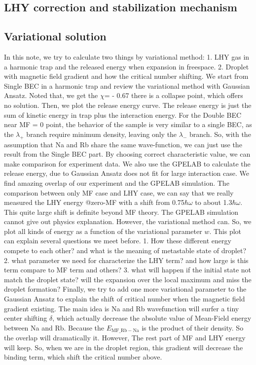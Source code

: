 \subsection{LHY correction and stabilization mechanism}
\subsection{Variational solution}
In this note, we try to calculate two things by variational method: 1. LHY gas in a harmonic trap and the released energy when expansion in freespace. 2. Droplet  with magnetic field gradient and how the critical number shifting. 
We start from Single BEC in a harmonic trap and review the variational method with Gaussian Ansatz. Noted that, we get the $\chi $= - 0.67 there is a collapse point, which offers no solution. Then, we plot the release energy curve. The release energy is just the sum of kinetic energy in trap plus the interaction energy. 
For the Double BEC near MF = 0 point, the behavior of the sample is very similar to a single BEC, as the $\lambda _+$ branch require minimum density, leaving only the $\lambda _-$ branch. So, with the assumption that Na and Rb share the same wave-function, we can just use the result from the Single BEC part. By choosing { }correct characteristic value, we can make comparison for experiment data.
We also use the GPELAB to calculate the release energy, due to Gaussian Ansatz does not fit for large interaction case. We find amazing overlap of our experiment and the GPELAB simulation. The comparison between only MF case and LHY case, we can say that we really measured the LHY energy @zero-MF with a shift from 0.75$\hbar \omega $ to about 1.3$\hbar \omega $. This quite large shift is definite beyond MF theory.
The GPELAB simulation cannot give out physics explanation. However, the variational method can. So, we plot all kinds of energy as a function of the variational parameter $w$. This plot can explain several questions we meet before. 1. How these different energy compete to each other? and what is the meaning of metastable state of droplet? 2. what parameter we need for characterize the LHY term? and how large is this term compare to MF term and others? 3. what will happen if the initial state not match the droplet state? will the expansion over the local maximum and miss the droplet formation?
Finally, we try to add one more variational parameter to the Gaussian Ansatz to explain the shift of critical number when the magnetic field gradient existing. The main idea is Na and Rb wavefunction will surfer a tiny center shifting $\delta $, which actually decrease the absolute value of Mean-Field energy between Na and Rb. Because the $E_{\text{MF$\_$Rb}-\text{Na}}$ is the product of their density. So the overlap will dramatically it. However, The rest part of MF and LHY energy will keep. So, when we are in the droplet region, this gradient will decrease the binding term, which shift the critical number above.

